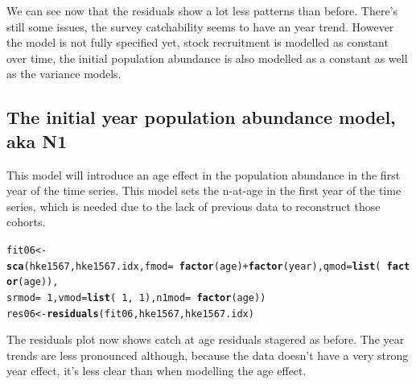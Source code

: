 \documentclass[a4paper,english,11pt]{article}\usepackage[]{graphicx}\usepackage[]{xcolor}
\makeatletter
\newcommand{\hlnum}[1]{\textcolor[rgb]{0.686,0.059,0.569}{#1}}%
\newcommand{\hlopt}[1]{\textcolor[rgb]{0,0,0}{#1}}%
\newcommand{\hldef}[1]{\textcolor[rgb]{0.345,0.345,0.345}{#1}}%
\newcommand{\hlkwb}[1]{\textcolor[rgb]{0.69,0.353,0.396}{#1}}%
\newcommand{\hlkwc}[1]{\textcolor[rgb]{0.333,0.667,0.333}{#1}}%
\newcommand{\hlkwd}[1]{\textcolor[rgb]{0.737,0.353,0.396}{\textbf{#1}}}%
\newenvironment{kframe}{%
 \def\at@end@of@kframe{}%
 \ifinner\ifhmode%
  \def\at@end@of@kframe{\end{minipage}}%
  \begin{minipage}{\columnwidth}%
 \fi\fi%
 \def\FrameCommand##1{\hskip\@totalleftmargin \hskip-\fboxsep
 \colorbox{shadecolor}{##1}\hskip-\fboxsep
     \hskip-\linewidth \hskip-\@totalleftmargin \hskip\columnwidth}%
 \MakeFramed {\advance\hsize-\width
   \@totalleftmargin\z@ \linewidth\hsize
   \@setminipage}}%
 {\par\unskip\endMakeFramed%
 \at@end@of@kframe}
\newenvironment{knitrout}{}{} %
\makeatother
\begin{document}
We can see now that the residuals show a lot less patterns than before. There's still some issues, the survey catchability seems to have an year trend. However the model is not fully specified yet, stock recruitment is modelled as constant over time, the initial population abundance is also modelled as a constant as well as the variance models.

\subsection{The initial year population abundance model, aka N1 }

This model will introduce an age effect in the population abundance in the first year of the time series. This model sets the n-at-age in the first year of the time series, which is needed due to the lack of previous data to reconstruct those cohorts.

\begin{knitrout}
\color{fgcolor}\begin{kframe}
\begin{alltt}
\hldef{fit06} \hlkwb{<-} \hlkwd{sca}\hldef{(hke1567, hke1567.idx,} \hlkwc{fmod} \hldef{=} \hlopt{~}\hlkwd{factor}\hldef{(age)} \hlopt{+} \hlkwd{factor}\hldef{(year),} \hlkwc{qmod} \hldef{=} \hlkwd{list}\hldef{(}\hlopt{~}\hlkwd{factor}\hldef{(age)),}
    \hlkwc{srmod} \hldef{=} \hlopt{~}\hlnum{1}\hldef{,} \hlkwc{vmod} \hldef{=} \hlkwd{list}\hldef{(}\hlopt{~}\hlnum{1}\hldef{,} \hlopt{~}\hlnum{1}\hldef{),} \hlkwc{n1mod} \hldef{=} \hlopt{~}\hlkwd{factor}\hldef{(age))}
\hldef{res06} \hlkwb{<-} \hlkwd{residuals}\hldef{(fit06, hke1567, hke1567.idx)}
\end{alltt}
\end{kframe}
\end{knitrout}

The residuals plot now shows catch at age residuals stagered as before. The year trends are less pronounced although, because the data doesn't have a very strong year effect, it's less clear than when modelling the age effect. 
\end{document}
